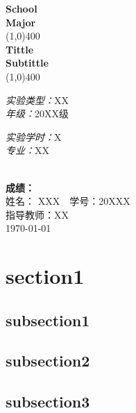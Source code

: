 \documentclass[UTF8]{ctexart}
\begin{document}
\begin{titlepage}
\begin{center}
\vspace*{1cm}
\Large{\textbf{School}}\\
\Large{\textbf{Major}}\\
\vfill
\line(1,0){400}\\[1mm]
\huge{\textbf{Tittle}}\\[3mm]
\Large{\textbf{Subtittle}}\\[1mm]
\line(1,0){400}\\
\begin{minipage}{0.4\textwidth}
\begin{flushleft} \large
\emph{实验类型：}XX\\
\emph{年级：}20XX级\\
\end{flushleft}
\end{minipage}
\begin{minipage}{0.4\textwidth}
\begin{flushright} \large
\emph{实验学时：}X\\
\emph{专业：}XX\\
\end{flushright}
\end{minipage}\\[3cm]
\vfill
\textbf{成绩：}\\
姓名： XXX\ \  学号：20XXX\\
指导教师：XX \\
\today \\
\end{center}
\end{titlepage}
\tableofcontents
\thispagestyle{empty}
\clearpage
\setcounter{page}{1}
\section{section1}
\subsection{subsection1}
\subsection{subsection2}
\subsection{subsection3}
\end{document}
